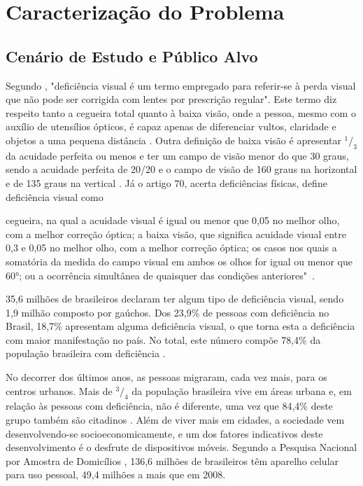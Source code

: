 \chapter{\label{chap:caract}Caracterização do Problema}

\section{Cenário de Estudo e Público Alvo}

Segundo \cite{MOURA2006}, "deficiência visual é um termo empregado para referir-se à perda visual que não pode ser corrigida com lentes por prescrição regular". Este termo diz respeito tanto a cegueira total quanto à baixa visão, onde a pessoa, mesmo com o auxílio de utensílios ópticos, é capaz apenas de diferenciar vultos, claridade e objetos a uma pequena distância \cite{TVESCOLA}. Outra definição de baixa visão é apresentar $^1/_3$ da acuidade perfeita ou menos e ter um campo de visão menor do que 30 graus, sendo a acuidade perfeita de 20/20 e o campo de visão de 160 graus na horizontal e de 135 graus na vertical \cite{ERGO2015}. Já o artigo 70, acerta deficiências físicas, define deficiência visual como 
\begin{directcite}
	cegueira, na qual a acuidade visual é igual ou menor que 0,05 no melhor olho, com a melhor correção óptica; a baixa visão, que significa acuidade visual entre 0,3 e 0,05 no melhor olho, com a melhor correção óptica; os casos nos quais a somatória da medida do campo visual em ambos os olhos for igual ou menor que 60°; ou a ocorrência simultânea de quaisquer das condições anteriores"\ \cite{D5296}.
\end{directcite}

35,6 milhões de brasileiros declaram ter algum tipo de deficiência visual, sendo 1,9 milhão composto por gaúchos. Dos 23,9\% de pessoas com deficiência no Brasil, 18,7\% apresentam alguma deficiência visual, o que torna esta a deficiência com maior manifestação no país. No total, este número compõe 78,4\% da população brasileira com deficiência \cite{IBGE2010}.

No decorrer dos últimos anos, as pessoas migraram, cada vez mais, para os centros urbanos. Mais de $^3/_4$ da população brasileira vive em áreas urbana \cite{IBGE2011} e, em relação às pessoas com deficiência, não é diferente, uma vez que 84,4\% deste grupo também são citadinos \cite{IBGE2010}. Além de viver mais em cidades, a sociedade vem desenvolvendo-se socioeconomicamente, e um dos fatores indicativos deste desenvolvimento é o desfrute de dispositivos móveis. Segundo a Pesquisa Nacional por Amostra de Domicílios \cite{PNAD2014}, 136,6 milhões de brasileiros têm aparelho celular para uso pessoal, 49,4 milhões a mais que em 2008. 

